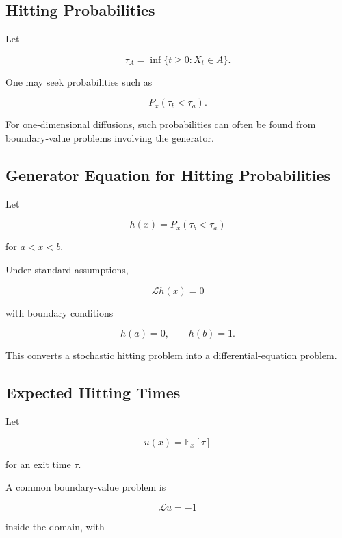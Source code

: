 \subsection{Hitting Probabilities}
\label{subsec:sde-hitting-probabilities}

Let

\[
\tau_A
=
\inf
\{
t\geq0:X_t\in A
\}.
\]

One may seek probabilities such as

\[
\boxed{
P_x
(
\tau_b<\tau_a
).
}
\]

For one-dimensional diffusions, such probabilities can often be found
from boundary-value problems involving the generator.

\subsection{Generator Equation for Hitting Probabilities}
\label{subsec:generator-hitting-probabilities}

Let

\[
h(x)
=
P_x
(
\tau_b<\tau_a
)
\]

for \(a<x<b\).

Under standard assumptions,

\[
\boxed{
\mathcal{L}h(x)=0
}
\]

with boundary conditions

\[
\boxed{
h(a)=0,
\qquad
h(b)=1.
}
\]

This converts a stochastic hitting problem into a differential-equation
problem.

\subsection{Expected Hitting Times}
\label{subsec:expected-hitting-times-sde}

Let

\[
u(x)
=
\mathbb{E}_x[\tau]
\]

for an exit time \(\tau\).

A common boundary-value problem is

\[
\boxed{
\mathcal{L}u=-1
}
\]

inside the domain, with

